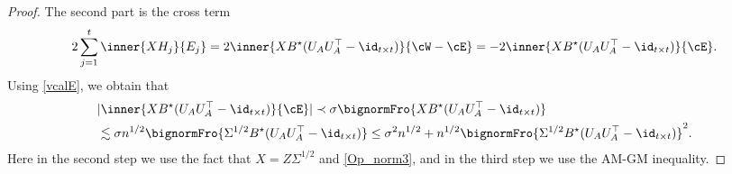 \documentclass[aos,preprint]{imsart}
\begin{document}
\begin{proof}
\medskip
	  The second part is the cross term %
	\begin{align*}%
		2\sum_{j=1}^t\inner{XH_j}{E_j} = 2\inner{XB^{\star} (U_A U_A^{\top} - \id_{t\times t})}{\cW  - \cE}
		= - 2\inner{X B^{\star} (U_A U_A^{\top} - \id_{t\times t})}{\cE}.
	\end{align*}
	Using \eqref{vcalE}, we obtain that %
	\begin{align*}
		&  |\inner{XB^{\star} (U_AU_A^{\top} - \id_{t\times t})}{\cE}|   \prec \sigma   \bignormFro{XB^{\star} (U_AU_A^{\top} - \id_{t\times t})} \nonumber \\
		&\lesssim \sigma n^{ 1/2}  \bignormFro{\Sigma^{1/2} B^{\star}(U_AU_A^{\top} -\id_{t\times t})}   \le \sigma^2 n^{1/2} + n^{ 1/2}  \bignormFro{\Sigma^{1/2} B^{\star}(U_AU_A^{\top} -\id_{t\times t})}^2.%
	\end{align*}
	Here in the second step we use the fact that $X=Z\Sigma^{1/2}$ and \eqref{Op_norm3}, and in the third step we use the AM-GM inequality. %


\end{proof}
\end{document}
